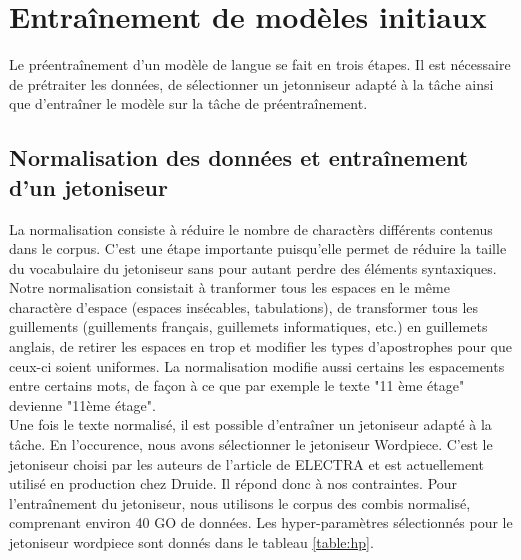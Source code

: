 \documentclass[12pt,twoside,maitrise]{dms}
\theoremstyle{definition}
\numberwithin{equation}{section}
\numberwithin{table}{chapter}
\numberwithin{figure}{chapter}
\begin{document}
\chapter{Entraînement de modèles initiaux}
Le préentraînement d'un modèle de langue se fait en trois étapes. Il est
nécessaire de prétraiter les données, de sélectionner un jetonniseur adapté à
la tâche ainsi que d'entraîner le modèle sur la tâche de préentraînement.

\section{Normalisation des données et entraînement d'un jetoniseur}
La normalisation consiste à réduire le nombre de charactèrs différents contenus
dans le corpus. C'est une étape importante puisqu'elle permet de réduire la
taille du vocabulaire du jetoniseur sans pour autant perdre des éléments
syntaxiques. Notre normalisation consistait à tranformer tous les espaces en le
même charactère d'espace (espaces insécables, tabulations), de transformer tous
les guillements (guillements français, guillemets informatiques, etc.) en
guillemets anglais, de retirer les espaces en trop et modifier les types
d'apostrophes pour que ceux-ci soient uniformes. La normalisation modifie aussi
certains les espacements entre certains mots, de façon à ce que par exemple le
texte "11 ème étage" devienne "11ème étage".\\%

Une fois le texte normalisé, il est possible d'entraîner un jetoniseur adapté à
la tâche. En l'occurence, nous avons sélectionner le jetoniseur Wordpiece.
C'est le jetoniseur choisi par les auteurs de l'article de ELECTRA et est
actuellement utilisé en production chez Druide. Il répond donc à nos
contraintes. Pour l'entraînement du jetoniseur, nous utilisons le corpus des
combis normalisé, comprenant environ 40 GO de données. Les hyper-paramètres
sélectionnés pour le jetoniseur wordpiece sont donnés dans le tableau \ref{table:hp}.\\
\end{document}
